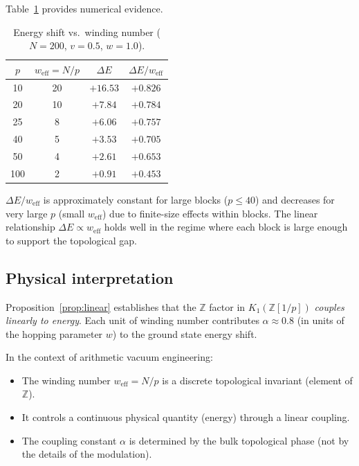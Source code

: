 \documentclass[11pt,a4paper]{article}
\newcommand{\Zp}{\mathbb{Z}[1/p]}
\begin{document}
Table~\ref{tab:energy} provides numerical evidence.

\begin{table}[h]
\centering
\caption{Energy shift vs.\ winding number
($N = 200$, $v = 0.5$, $w = 1.0$).}
\label{tab:energy}
\begin{tabular}{@{}cccc@{}}
\toprule
$p$ & $w_{\mathrm{eff}} = N/p$ & $\Delta E$ & $\Delta E / w_{\mathrm{eff}}$ \\
\midrule
10 & 20 & $+16.53$ & $+0.826$ \\
20 & 10 & $+7.84$ & $+0.784$ \\
25 & 8 & $+6.06$ & $+0.757$ \\
40 & 5 & $+3.53$ & $+0.705$ \\
50 & 4 & $+2.61$ & $+0.653$ \\
100 & 2 & $+0.91$ & $+0.453$ \\
\bottomrule
\end{tabular}
\end{table}

$\Delta E / w_{\mathrm{eff}}$ is approximately constant for
large blocks ($p \leq 40$) and decreases for very large $p$
(small $w_{\mathrm{eff}}$) due to finite-size effects within blocks.
The linear relationship $\Delta E \propto w_{\mathrm{eff}}$
holds well in the regime where each block is large enough to
support the topological gap.

\subsection{Physical interpretation}

Proposition~\ref{prop:linear} establishes that the $\mathbb{Z}$
factor in $K_1(\Zp)$ \emph{couples linearly to energy}.
Each unit of winding number contributes $\alpha \approx 0.8$
(in units of the hopping parameter $w$) to the ground state
energy shift.

In the context of arithmetic vacuum engineering:
\begin{itemize}
\item The winding number $w_{\mathrm{eff}} = N/p$ is a
  discrete topological invariant (element of $\mathbb{Z}$).
\item It controls a continuous physical quantity (energy)
  through a linear coupling.
\item The coupling constant $\alpha$ is determined by the
  bulk topological phase (not by the details of the modulation).
\end{itemize}
\end{document}
